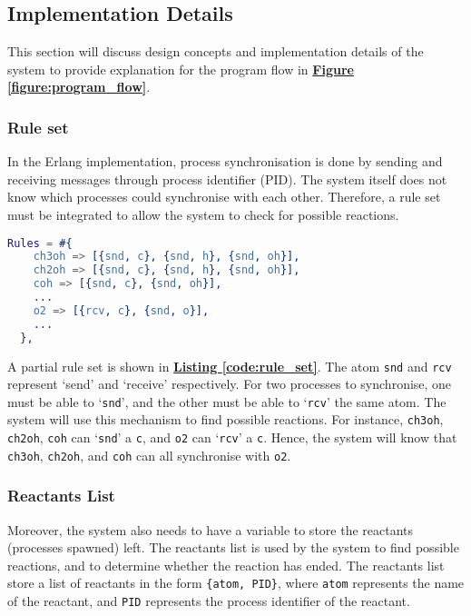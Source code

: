 \documentclass[12pt, a4paper]{article}
\begin{document}
\subsection{Implementation Details}
This section will discuss design concepts and implementation details of the system to provide
explanation for the program flow in \hyperref[figure:program_flow]{\textbf{Figure
\ref*{figure:program_flow}}}.

\subsubsection{Rule set}
In the Erlang implementation, process synchronisation is done by sending and receiving messages
through process identifier (PID). The system itself does not know which processes could synchronise
with each other. Therefore, a rule set must be integrated to allow the system to check for possible
reactions.

\begin{lstlisting}[language=erlang, label=code:rule_set,xleftmargin=.2\textwidth,
  xrightmargin=.2\textwidth, caption=A rule set definition in Erlang maps \cite{erlang_maps}]
  Rules = #{
    ch3oh => [{snd, c}, {snd, h}, {snd, oh}],
    ch2oh => [{snd, c}, {snd, h}, {snd, oh}],
    coh => [{snd, c}, {snd, oh}],
    ...
    o2 => [{rcv, c}, {snd, o}],
    ...
  },
\end{lstlisting}

A partial rule set is shown in \hyperref[code:rule_set]{\textbf{Listing \ref*{code:rule_set}}}. The
atom \texttt{snd} and \texttt{rcv} represent `send' and `receive' respectively. For two processes to
synchronise, one must be able to `\texttt{snd}', and the other must be able to `\texttt{rcv}' the
same atom. The system will use this mechanism to find possible reactions. For instance,
\texttt{ch3oh}, \texttt{ch2oh}, \texttt{coh} can `\texttt{snd}' a \texttt{c}, and \texttt{o2} can
`\texttt{rcv}' a \texttt{c}. Hence, the system will know that \texttt{ch3oh}, \texttt{ch2oh}, and
\texttt{coh} can all synchronise with \texttt{o2}.

\subsubsection{Reactants List}
Moreover, the system also needs to have a variable to store the reactants (processes spawned) left.
The reactants list is used by the system to find possible reactions, and to determine whether the
reaction has ended. The reactants list store a list of reactants in the form \texttt{\{atom, PID\}},
where \texttt{atom} represents the name of the reactant, and \texttt{PID} represents the process
identifier of the reactant.
\end{document}
